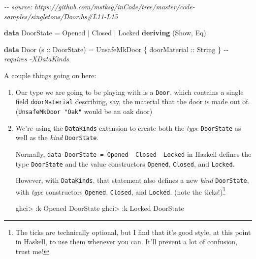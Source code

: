 \documentclass[]{article}
\newenvironment{Shaded}{}{}
\newcommand{\CommentTok}[1]{\textcolor[rgb]{0.38,0.63,0.69}{\textit{#1}}}
\newcommand{\DataTypeTok}[1]{\textcolor[rgb]{0.56,0.13,0.00}{#1}}
\newcommand{\KeywordTok}[1]{\textcolor[rgb]{0.00,0.44,0.13}{\textbf{#1}}}
\newcommand{\NormalTok}[1]{#1}
\newcommand{\OperatorTok}[1]{\textcolor[rgb]{0.40,0.40,0.40}{#1}}
\newcommand{\OtherTok}[1]{\textcolor[rgb]{0.00,0.44,0.13}{#1}}
\begin{document}
\begin{Shaded}
\begin{Highlighting}[]
\CommentTok{{-}{-} source: https://github.com/mstksg/inCode/tree/master/code{-}samples/singletons/Door.hs\#L11{-}L15}

\KeywordTok{data} \DataTypeTok{DoorState} \OtherTok{=} \DataTypeTok{Opened} \OperatorTok{|} \DataTypeTok{Closed} \OperatorTok{|} \DataTypeTok{Locked}
  \KeywordTok{deriving}\NormalTok{ (}\DataTypeTok{Show}\NormalTok{, }\DataTypeTok{Eq}\NormalTok{)}

\KeywordTok{data} \DataTypeTok{Door}\NormalTok{ (}\OtherTok{s ::} \DataTypeTok{DoorState}\NormalTok{) }\OtherTok{=} \DataTypeTok{UnsafeMkDoor}\NormalTok{ \{}\OtherTok{ doorMaterial ::} \DataTypeTok{String}\NormalTok{ \}}
                  \CommentTok{{-}{-} requires {-}XDataKinds}
\end{Highlighting}
\end{Shaded}

A couple things going on here:

\begin{enumerate}
\def\labelenumi{\arabic{enumi}.}
\item
  Our type we are going to be playing with is a \texttt{Door}, which contains a
  single field \texttt{doorMaterial} describing, say, the material that the door
  is made out of. (\texttt{UnsafeMkDoor\ "Oak"} would be an oak door)
\item
  We're using the \texttt{DataKinds} extension to create both the \emph{type}
  \texttt{DoorState} as well as the \emph{kind} \texttt{DoorState}.

  Normally,
  \texttt{data\ DoorState\ =\ Opened\ \textbar{}\ Closed\ \textbar{}\ Locked} in
  Haskell defines the type \texttt{DoorState} and the value constructors
  \texttt{Opened}, \texttt{Closed}, and \texttt{Locked}.

  However, with \texttt{DataKinds}, that statement also defines a new
  \emph{kind} \texttt{DoorState}, with \emph{type} constructors
  \texttt{\textquotesingle{}Opened}, \texttt{\textquotesingle{}Closed}, and
  \texttt{\textquotesingle{}Locked}. (note the \texttt{\textquotesingle{}}
  ticks!)\footnote{The \texttt{\textquotesingle{}} ticks are technically
    optional, but I find that it's good style, at this point in Haskell, to use
    them whenever you can. It'll prevent a lot of confusion, trust me!}

\begin{Shaded}
\begin{Highlighting}[]
\NormalTok{ghci}\OperatorTok{>} \OperatorTok{:}\NormalTok{k }\DataTypeTok{\textquotesingle{}Opened}
\DataTypeTok{DoorState}
\NormalTok{ghci}\OperatorTok{>} \OperatorTok{:}\NormalTok{k }\DataTypeTok{\textquotesingle{}Locked}
\DataTypeTok{DoorState}
\end{Highlighting}
\end{Shaded}
\end{enumerate}
\end{document}
